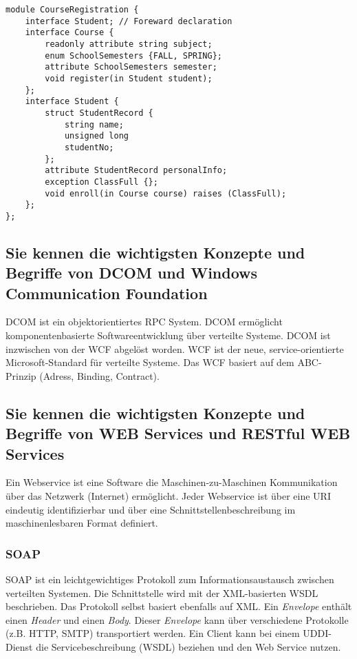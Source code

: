 \begin{lstlisting}[language=IDL, caption={Interface Definition Language (IDL) Beispiel}, label=lst:idl]
module CourseRegistration { 
	interface Student; // Foreward declaration 
	interface Course { 
		readonly attribute string subject; 
		enum SchoolSemesters {FALL, SPRING}; 
		attribute SchoolSemesters semester; 
		void register(in Student student); 
	}; 
	interface Student {
		struct StudentRecord { 
			string name; 
			unsigned long 
			studentNo; 
		}; 
		attribute StudentRecord personalInfo; 
		exception ClassFull {}; 
		void enroll(in Course course) raises (ClassFull); 
	}; 
};
\end{lstlisting}

\subsection{Sie kennen die wichtigsten Konzepte und Begriffe von DCOM und Windows Communication Foundation}

\ac{DCOM} ist ein objektorientiertes RPC System. DCOM ermöglicht komponentenbasierte Softwareentwicklung über verteilte Systeme. \ac{DCOM} ist inzwischen von der \ac{WCF} abgelöst worden. \ac{WCF} ist der neue, service-orientierte Microsoft-Standard für verteilte Systeme. Das \ac{WCF} basiert auf dem ABC-Prinzip (Adress, Binding, Contract).

\subsection{Sie kennen die wichtigsten Konzepte und Begriffe von WEB Services und RESTful WEB Services}

Ein Webservice ist eine Software die Maschinen-zu-Maschinen Kommunikation über das Netzwerk (Internet) ermöglicht. Jeder Webservice ist über eine \ac{URI} eindeutig identifizierbar und über eine Schnittstellenbeschreibung im maschinenlesbaren Format definiert.

\subsubsection{SOAP}

SOAP ist ein leichtgewichtiges Protokoll zum Informationsaustausch zwischen verteilten Systemen. Die Schnittstelle wird mit der XML-basierten \ac{WSDL} beschrieben. Das Protokoll selbst basiert ebenfalls auf XML. Ein \emph{Envelope} enthält einen \emph{Header} und einen \emph{Body}. Dieser \emph{Envelope} kann über verschiedene Protokolle (z.B. HTTP, SMTP) transportiert werden. Ein Client kann bei einem \acs{UDDI}-Dienst die Servicebeschreibung (\ac{WSDL}) beziehen und den Web Service nutzen.

